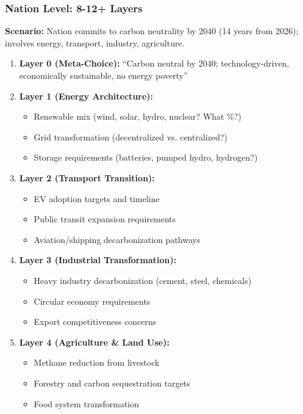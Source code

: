 \documentclass[11pt, a4paper]{article}
\begin{document}
\subsubsection{Nation Level: 8-12+ Layers}

\begin{tcolorbox}[colback=gray!5!white, colframe=gray!75!black, title=Example: National Climate Neutrality (e.g., Carbon Reduction Transformation)]

\textbf{Scenario:} Nation commits to carbon neutrality by 2040 (14 years from 2026); involves energy, transport, industry, agriculture.

\begin{enumerate}
    \item \textbf{Layer 0 (Meta-Choice):} ``Carbon neutral by 2040; technology-driven, economically sustainable, no energy poverty''

    \item \textbf{Layer 1 (Energy Architecture):}
    \begin{itemize}[nosep]
        \item Renewable mix (wind, solar, hydro, nuclear? What \%?)
        \item Grid transformation (decentralized vs. centralized?)
        \item Storage requirements (batteries, pumped hydro, hydrogen?)
    \end{itemize}

    \item \textbf{Layer 2 (Transport Transition):}
    \begin{itemize}[nosep]
        \item EV adoption targets and timeline
        \item Public transit expansion requirements
        \item Aviation/shipping decarbonization pathways
    \end{itemize}

    \item \textbf{Layer 3 (Industrial Transformation):}
    \begin{itemize}[nosep]
        \item Heavy industry decarbonization (cement, steel, chemicals)
        \item Circular economy requirements
        \item Export competitiveness concerns
    \end{itemize}

    \item \textbf{Layer 4 (Agriculture \& Land Use):}
    \begin{itemize}[nosep]
        \item Methane reduction from livestock
        \item Forestry and carbon sequestration targets
        \item Food system transformation
    \end{itemize}


\end{enumerate}
\end{tcolorbox}
\end{document}
